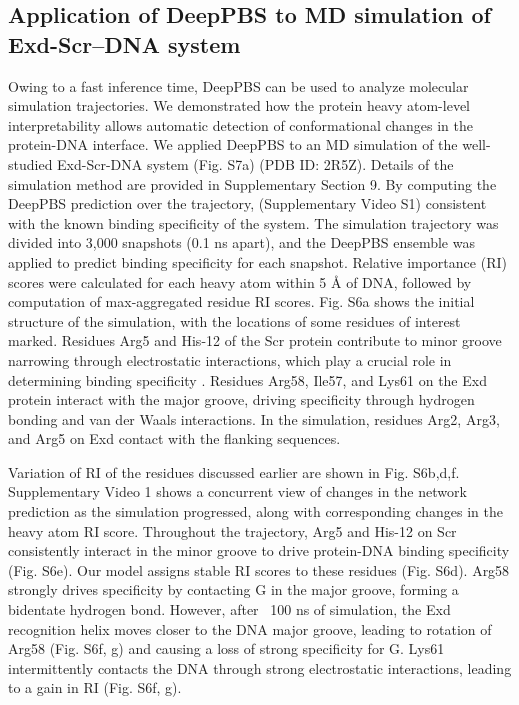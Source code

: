 \subsection{Application of DeepPBS to MD simulation of Exd-Scr–DNA system}

Owing to a fast inference time, DeepPBS can be used to analyze molecular simulation trajectories. We demonstrated how the protein heavy atom-level interpretability allows automatic detection of conformational changes in the protein-DNA interface. We applied DeepPBS to an MD simulation of the well-studied Exd-Scr-DNA system (Fig. S7a) (PDB ID: 2R5Z)\citep{Abe2015, Chiu2022, Ghoshdastidar2022, Slattery2011}. Details of the simulation method are provided in Supplementary Section 9. By computing the DeepPBS prediction over the trajectory, (Supplementary Video S1) consistent with the known binding specificity \citep{Abe2015} of the system. The
simulation trajectory was divided into 3,000 snapshots (0.1 ns apart), and the DeepPBS ensemble was applied to predict binding specificity for each snapshot. Relative importance (RI) scores were calculated for each heavy atom within 5 Å of DNA, followed by computation of max-aggregated residue RI scores. Fig. S6a shows the initial structure of the simulation, with the locations of some residues of interest marked. Residues Arg5 and His-12 of the Scr protein contribute to minor groove narrowing through electrostatic interactions, which play a crucial role in determining binding specificity \citep{Joshi2007}. 
Residues Arg58, Ile57, and Lys61 on the Exd protein interact with the major groove, driving specificity through hydrogen bonding and van der Waals interactions. In the simulation, residues Arg2, Arg3, and Arg5 on Exd contact with the flanking sequences. 

Variation of RI of the residues discussed earlier are shown in Fig. S6b,d,f. Supplementary Video 1 shows a concurrent view of changes in the network prediction as the simulation progressed, along with corresponding changes in the heavy atom RI score. Throughout the trajectory, Arg5 and His-12 on Scr consistently interact in the minor groove to drive protein-DNA binding specificity (Fig. S6e). Our model assigns stable RI scores to these residues (Fig. S6d). Arg58 strongly drives specificity by contacting G in the major groove, forming a bidentate hydrogen bond. However, after ~100 ns of simulation, the Exd recognition helix moves closer to the DNA major groove, leading to rotation of Arg58 (Fig. S6f, g) and causing a loss of strong specificity for G. Lys61 intermittently contacts the DNA through strong electrostatic interactions, leading to a gain in RI (Fig. S6f, g). 

